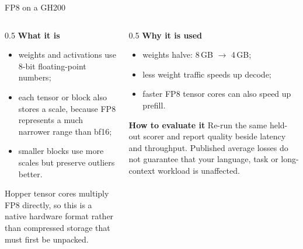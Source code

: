 \documentclass[aspectratio=169,10pt]{beamer}
\begin{document}
\begin{frame}{FP8 on a GH200}
  \begin{columns}[T]
    \begin{column}{0.5\textwidth}
      \textbf{What it is}
      \begin{itemize}
        \item weights and activations use 8-bit floating-point numbers;
        \item each tensor or block also stores a scale, because FP8 represents
          a much narrower range than bf16;
        \item smaller blocks use more scales but preserve outliers better.
      \end{itemize}
      Hopper tensor cores multiply FP8 directly, so this is a native hardware
      format rather than compressed storage that must first be unpacked.
    \end{column}
    \begin{column}{0.5\textwidth}
      \textbf{Why it is used}
      \begin{itemize}
        \item weights halve: 8\,GB $\to$ 4\,GB;
        \item less weight traffic speeds up decode;
        \item faster FP8 tensor cores can also speed up prefill.
      \end{itemize}
      \textbf{How to evaluate it}
      Re-run the same held-out scorer and report quality beside latency and
      throughput. Published average losses do not guarantee that your
      language, task or long-context workload is unaffected.
    \end{column}
  \end{columns}
\end{frame}
\end{document}
